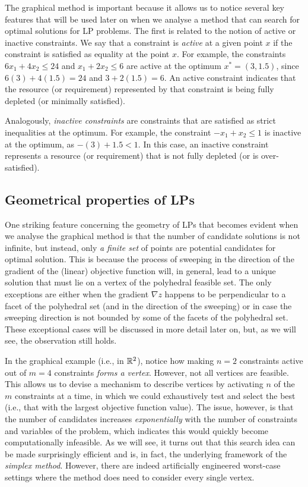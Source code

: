 The graphical method is important because it allows us to notice several key features that will be used later on when we analyse a method that can search for optimal solutions for LP problems. The first is related to the notion of active or inactive constraints. We say that a constraint is \emph{active} at a given point $x$ if the constraint is satisfied as equality at the point $x$. For example, the constraints $6x_1 + 4x_2 \leq 24$ and $x_1 + 2x_2 \leq 6$ are active at the optimum $x^* = (3, 1.5)$, since $6(3) + 4(1.5) = 24$ and $3 + 2(1.5) = 6$. An active constraint indicates that the resource (or requirement) represented by that constraint is being fully depleted (or minimally satisfied). 

Analogously, \emph{inactive constraints} are constraints that are satisfied as strict inequalities at the optimum. For example, the constraint $-x_1 + x_2 \leq 1$ is inactive at the optimum, as $-(3) + 1.5 < 1$. In this case, an inactive constraint represents a resource (or requirement) that is not fully depleted (or is over-satisfied).


\subsection{Geometrical properties of LPs}

One striking feature concerning the geometry of LPs that becomes evident when we analyse the graphical method is that the number of candidate solutions is not infinite, but instead, only \emph{a finite set} of points are potential candidates for optimal solution. This is because the process of sweeping in the direction of the gradient of the (linear) objective function will, in general, lead to a unique solution that must lie on a vertex of the polyhedral feasible set. The only exceptions are either when the gradient $\nabla z$ happens to be perpendicular to a facet of the polyhedral set (and in the direction of the sweeping) or in case the sweeping direction is not bounded by some of the facets of the polyhedral set. These exceptional cases will be discussed in more detail later on, but, as we will see, the observation still holds.

In the graphical example (i.e., in $\mathbb{R}^2$), notice how making $n = 2$ constraints active out of $m = 4$ constraints \emph{forms a vertex}. However, not all vertices are feasible. This allows us to devise a mechanism to describe vertices by activating $n$ of the $m$ constraints at a time, in which we could exhaustively test and select the best (i.e., that with the largest objective function value). The issue, however, is that the number of candidates increases \emph{exponentially} with the number of constraints and variables of the problem, which indicates this would quickly become computationally infeasible. As we will see, it turns out that this search idea can be made surprisingly efficient and is, in fact, the underlying framework of the \emph{simplex method}. However, there are indeed artificially engineered worst-case settings where the method does need to consider every single vertex.

